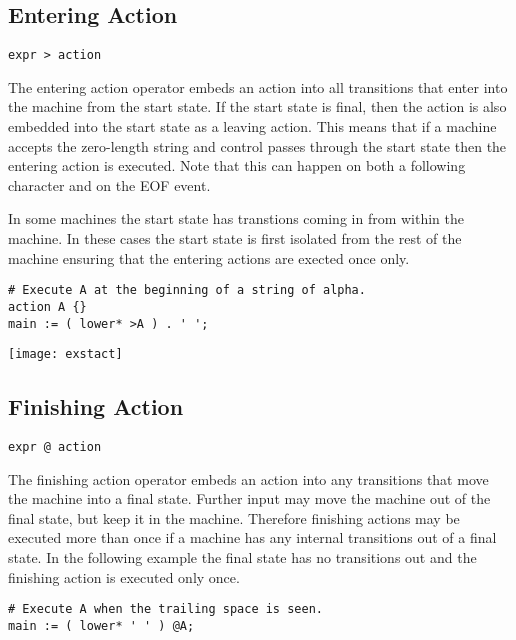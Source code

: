 \documentclass[letterpaper,11pt,oneside]{book}
\newcommand{\verbspace}{\vspace{10pt}}
\newcommand{\graphspace}{\vspace{10pt}}
\newenvironment{inline_code}{\def\baselinestretch{1}\vspace{12pt}\small}{}
\begin{document}
\subsection{Entering Action}

\verb|expr > action| 
\verbspace

The entering action operator embeds an action into all transitions
that enter into the machine from the start state. If the start state is final,
then the action is also embedded into the start state as a leaving action. This
means that if a machine accepts the zero-length string and control passes
through the start state then the entering action is executed. Note
that this can happen on both a following character and on the EOF event.

In some machines the start state has transtions coming in from within the
machine. In these cases the start state is first isolated from the rest of the
machine ensuring that the entering actions are exected once only.

\verbspace

% GENERATE: exstact
\begin{inline_code}
\begin{verbatim}
# Execute A at the beginning of a string of alpha.
action A {}
main := ( lower* >A ) . ' ';
\end{verbatim}
\end{inline_code}

\graphspace
\begin{center}
\texttt{[image: exstact]}
\end{center}
\graphspace

\subsection{Finishing Action}

\verb|expr @ action|
\verbspace

The finishing action operator embeds an action into any transitions that move
the machine into a final state. Further input may move the machine out of the
final state, but keep it in the machine. Therefore finishing actions may be
executed more than once if a machine has any internal transitions out of a
final state. In the following example the final state has no transitions out
and the finishing action is executed only once.

\begin{inline_code}
\begin{verbatim}
# Execute A when the trailing space is seen.
main := ( lower* ' ' ) @A;
\end{verbatim}
\end{inline_code}
\end{document}
